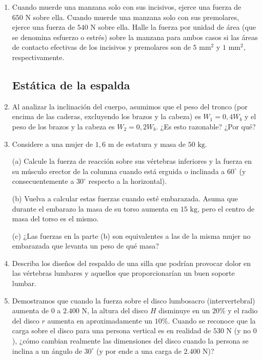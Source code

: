 \documentclass[12pt]{book}
\begin{document}
\begin{enumerate}
\item[2.29] Cuando muerde una manzana solo con sus incisivos, ejerce una fuerza de $650\text{ N}$ sobre ella. Cuando muerde una manzana solo con sus premolares, ejerce una fuerza de $540\text{ N}$ sobre ella. Halle la fuerza por unidad de área (que se denomina esfuerzo o estrés) sobre la manzana para ambos casos si las áreas de contacto efectivas de los incisivos y premolares son de $5\text{ mm}^2$ y $1\text{ mm}^2$, respectivamente.

\subsection*{Estática de la espalda}

\item[2.30] Al analizar la inclinación del cuerpo, asumimos que el peso del tronco (por encima de las caderas, excluyendo los brazos y la cabeza) es $W_1 = 0,4 W_b$ y el peso de los brazos y la cabeza es $W_2 = 0,2 W_b$. ¿Es esto razonable? ¿Por qué?

\item[2.31] Considere a una mujer de $1,6\text{ m}$ de estatura y masa de $50\text{ kg}$.

(a) Calcule la fuerza de reacción sobre sus vértebras inferiores y la fuerza en su músculo erector de la columna cuando está erguida o inclinada a $60^\circ$ (y consecuentemente a $30^\circ$ respecto a la horizontal).

(b) Vuelva a calcular estas fuerzas cuando esté embarazada. Asuma que durante el embarazo la masa de su torso aumenta en $15\text{ kg}$, pero el centro de masa del torso es el mismo.

(c) ¿Las fuerzas en la parte (b) son equivalentes a las de la misma mujer no embarazada que levanta un peso de qué masa?

\item[2.32] Describa los diseños del respaldo de una silla que podrían provocar dolor en las vértebras lumbares y aquellos que proporcionarían un buen soporte lumbar.

\item[2.33] Demostramos que cuando la fuerza sobre el disco lumbosacro (intervertebral) aumenta de $0$ a $2.400\text{ N}$, la altura del disco $H$ disminuye en un $20\%$ y el radio del disco $r$ aumenta en aproximadamente un $10\%$. Cuando se reconoce que la carga sobre el disco para una persona vertical es en realidad de $530\text{ N}$ (y no $0$), ¿cómo cambian realmente las dimensiones del disco cuando la persona se inclina a un ángulo de $30^\circ$ (y por ende a una carga de $2.400\text{ N}$)?


\end{enumerate}
\end{document}
